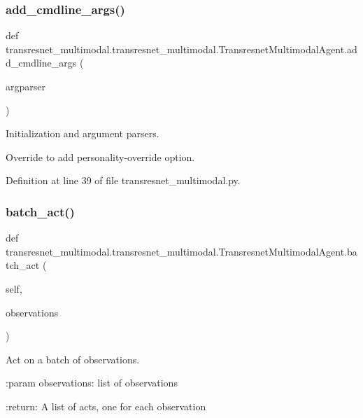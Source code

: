 \subsubsection{\texorpdfstring{add\+\_\+cmdline\+\_\+args()}{add\_cmdline\_args()}}
{\footnotesize\ttfamily def transresnet\+\_\+multimodal.\+transresnet\+\_\+multimodal.\+Transresnet\+Multimodal\+Agent.\+add\+\_\+cmdline\+\_\+args (\begin{DoxyParamCaption}\item[{}]{argparser }\end{DoxyParamCaption})\hspace{0.3cm}{\ttfamily [static]}}



Initialization and argument parsers. 

\begin{DoxyVerb}Override to add personality-override option.\end{DoxyVerb}
 

Definition at line 39 of file transresnet\+\_\+multimodal.\+py.

\mbox{\label{classtransresnet__multimodal_1_1transresnet__multimodal_1_1TransresnetMultimodalAgent_a057eb1109f5c2ea467539083e2f7e7f6}} 
\subsubsection{\texorpdfstring{batch\+\_\+act()}{batch\_act()}}
{\footnotesize\ttfamily def transresnet\+\_\+multimodal.\+transresnet\+\_\+multimodal.\+Transresnet\+Multimodal\+Agent.\+batch\+\_\+act (\begin{DoxyParamCaption}\item[{}]{self,  }\item[{}]{observations }\end{DoxyParamCaption})}

\begin{DoxyVerb}Act on a batch of observations.

:param observations:
    list of observations

:return:
    A list of acts, one for each observation
\end{DoxyVerb}
 

